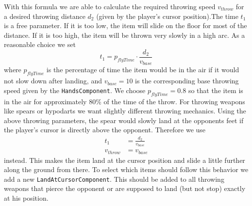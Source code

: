 \documentclass[12pt,a4paper]{article}
\begin{document}
With this formula we are able to calculate the required throwing speed $v_{throw}$ for a desired throwing distance $d_2$ (given by the player's cursor position).The time $t_1$ is a free parameter. If it is too low, the item will slide on the floor for most of the distance. If it is too high, the item will be thrown very slowly in a high arc. As a reasonable choice we set
\begin{equation}
t_1 = p_{flyTime} \cdot \frac{d_2}{v_{base}}
\end{equation}
where $p_{flyTime}$ is the percentage of time the item would be  in the air if it would not slow down after landing, and $v_{base}=10$ is the corresponding base throwing speed given by the \texttt{HandsComponent}. We choose $p_{flyTime}=0.8$ so that the item is in the air for approximately 80\% of the time of the throw.
\vskip 0.5cm
For throwing weapons like spears or hypodarts we want slightly different throwing mechanics. Using the above throwing parameters, the spear would slowly land at the opponents feet if the player's cursor is directly above the opponent. Therefore we use
\begin{align*}
t_1&=\frac{d_2}{v_{base}}\\
v_{throw}&=v_{base}
\end{align*}
instead. This makes the item land at the cursor position and slide a little further along the ground from there. To select which items should follow this behavior we add a new \texttt{LandAtCursorComponent}. This should be added to all throwing weapons that pierce the opponent or are supposed to land (but not stop) exactly at his position.
\end{document}
